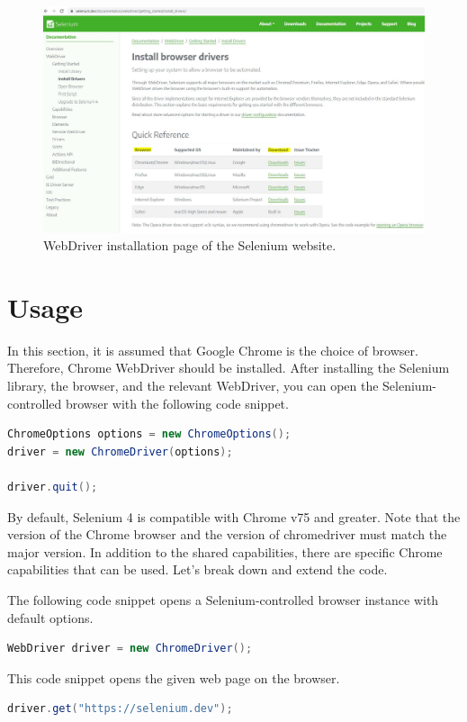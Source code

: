 \begin{figure}
    \includegraphics{images/selenium1-detailed-install-2.jpg}
    \caption{WebDriver installation page of the Selenium website.}
\end{figure}

\section{Usage}
In this section, it is assumed that Google Chrome is the choice of browser. Therefore, Chrome WebDriver should be installed. After installing the Selenium library, the browser, and the relevant WebDriver, you can open the Selenium-controlled browser with the following code snippet.

\begin{lstlisting}[language=java,caption={Start a Selenium-controlled browser instance.}]
ChromeOptions options = new ChromeOptions();
driver = new ChromeDriver(options);

driver.quit();
\end{lstlisting}

By default, Selenium 4 is compatible with Chrome v75 and greater. Note that the version of the Chrome browser and the version of chromedriver must match the major version. In addition to the shared capabilities, there are specific Chrome capabilities that can be used. Let's break down and extend the code.

The following code snippet opens a Selenium-controlled browser instance with default options.
\begin{lstlisting}[language=java]
WebDriver driver = new ChromeDriver();
\end{lstlisting}

This code snippet opens the given web page on the browser.
\begin{lstlisting}[language=java]
driver.get("https://selenium.dev");
\end{lstlisting}

